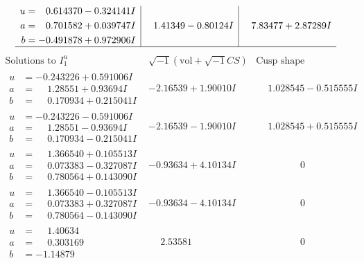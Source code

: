 \documentclass[1p]{elsarticle_modified}
\theoremstyle{definition}
\newcommand{\I}{\sqrt{-1}}
\begin{document}
$$\begin{array}{c|c|c}
\begin{aligned}
u &= \phantom{-}0.614370 - 0.324141 I \\
a &= \phantom{-}0.701582 + 0.039747 I \\
b &= -0.491878 + 0.972906 I\end{aligned}
 & \phantom{-}1.41349 - 0.80124 I & \phantom{-}7.83477 + 2.87289 I\\
 \hline 
 \end{array}$$\newpage$$\begin{array}{c|c|c}  
\text{Solutions to }I^u_{1}& \I (\text{vol} + \sqrt{-1}CS) & \text{Cusp shape}\\
 \hline 
\begin{aligned}
u &= -0.243226 + 0.591006 I \\
a &= \phantom{-}1.28551 + 0.93694 I \\
b &= \phantom{-}0.170934 + 0.215041 I\end{aligned}
 & -2.16539 + 1.90010 I & \phantom{-}1.028545 - 0.515555 I \\ \hline\begin{aligned}
u &= -0.243226 - 0.591006 I \\
a &= \phantom{-}1.28551 - 0.93694 I \\
b &= \phantom{-}0.170934 - 0.215041 I\end{aligned}
 & -2.16539 - 1.90010 I & \phantom{-}1.028545 + 0.515555 I \\ \hline\begin{aligned}
u &= \phantom{-}1.366540 + 0.105513 I \\
a &= \phantom{-}0.073383 - 0.327087 I \\
b &= \phantom{-}0.780564 + 0.143090 I\end{aligned}
 & -0.93634 + 4.10134 I & \phantom{-0.000000 } 0 \\ \hline\begin{aligned}
u &= \phantom{-}1.366540 - 0.105513 I \\
a &= \phantom{-}0.073383 + 0.327087 I \\
b &= \phantom{-}0.780564 - 0.143090 I\end{aligned}
 & -0.93634 - 4.10134 I & \phantom{-0.000000 } 0 \\ \hline\begin{aligned}
u &= \phantom{-}1.40634\phantom{ +0.000000I} \\
a &= \phantom{-}0.303169\phantom{ +0.000000I} \\
b &= -1.14879\phantom{ +0.000000I}\end{aligned}
 & \phantom{-}2.53581\phantom{ +0.000000I} & \phantom{-0.000000 } 0 \\ \hline\begin{aligned}

\end{aligned}
\end{array}$$
\end{document}
